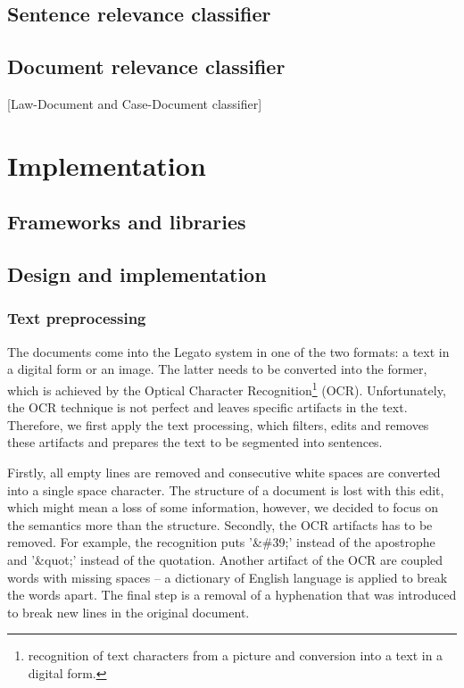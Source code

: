 \documentclass[
  digital, %
  table,   %
  lof,     %
  lot,     %
]{fithesis3}
\begin{document}
\section{Sentence relevance classifier}
\label{sec:sentence-classifier}


\section{Document relevance classifier}
\label{sec:document-classifier}
[Law-Document and Case-Document classifier]


\chapter{Implementation}
\section{Frameworks and libraries}
\section{Design and implementation}

\subsection{Text preprocessing}
The documents come into the Legato system in one of the two formats: a text in a digital form or an image.
The latter needs to be converted into the former, which is achieved by the Optical Character Recognition\footnote{recognition of text characters from a picture and conversion into a text in a digital form.} (OCR).
Unfortunately, the OCR technique is not perfect and leaves specific artifacts in the text.
Therefore, we first apply the text processing, which filters, edits and removes these artifacts and prepares the text to be segmented into sentences.

Firstly, all empty lines are removed and consecutive white spaces are converted into a single space character.
The structure of a document is lost with this edit, which might mean a loss of some information, however, we decided to focus on the semantics more than the structure.
Secondly, the OCR artifacts has to be removed.
For example, the recognition puts '\&\#39;' instead of the apostrophe and '\&quot;' instead of the quotation.
Another artifact of the OCR are coupled words with missing spaces -- a dictionary of English language is applied to break the words apart.
The final step is a removal of a hyphenation that was introduced to break new lines in the original document.
\end{document}
